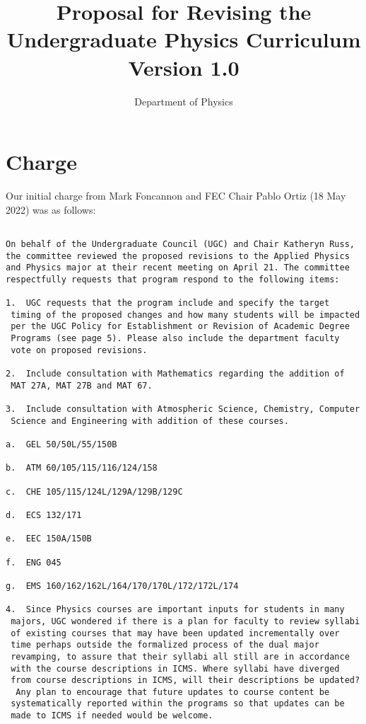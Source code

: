 \documentclass[12pt]{article}
\begin{document}

\title{Proposal for Revising the \\ Undergraduate Physics Curriculum \\ Version 1.0}
\author{Department of Physics}

\maketitle


\section{Charge}

Our initial charge from Mark Foncannon and FEC Chair Pablo Ortiz (18 May 2022) was as follows:
\begin{verbatim}

On behalf of the Undergraduate Council (UGC) and Chair Katheryn Russ,
the committee reviewed the proposed revisions to the Applied Physics
and Physics major at their recent meeting on April 21. The committee
respectfully requests that program respond to the following items:

1.  UGC requests that the program include and specify the target
 timing of the proposed changes and how many students will be impacted
 per the UGC Policy for Establishment or Revision of Academic Degree
 Programs (see page 5). Please also include the department faculty
 vote on proposed revisions.

2.  Include consultation with Mathematics regarding the addition of
 MAT 27A, MAT 27B and MAT 67.

3.  Include consultation with Atmospheric Science, Chemistry, Computer
 Science and Engineering with addition of these courses.

a.  GEL 50/50L/55/150B

b.  ATM 60/105/115/116/124/158

c.  CHE 105/115/124L/129A/129B/129C

d.  ECS 132/171

e.  EEC 150A/150B

f.  ENG 045

g.  EMS 160/162/162L/164/170/170L/172/172L/174

4.  Since Physics courses are important inputs for students in many
 majors, UGC wondered if there is a plan for faculty to review syllabi
 of existing courses that may have been updated incrementally over
 time perhaps outside the formalized process of the dual major
 revamping, to assure that their syllabi all still are in accordance
 with the course descriptions in ICMS. Where syllabi have diverged
 from course descriptions in ICMS, will their descriptions be updated?
  Any plan to encourage that future updates to course content be
 systematically reported within the programs so that updates can be
 made to ICMS if needed would be welcome.
\end{verbatim}
\end{document}
